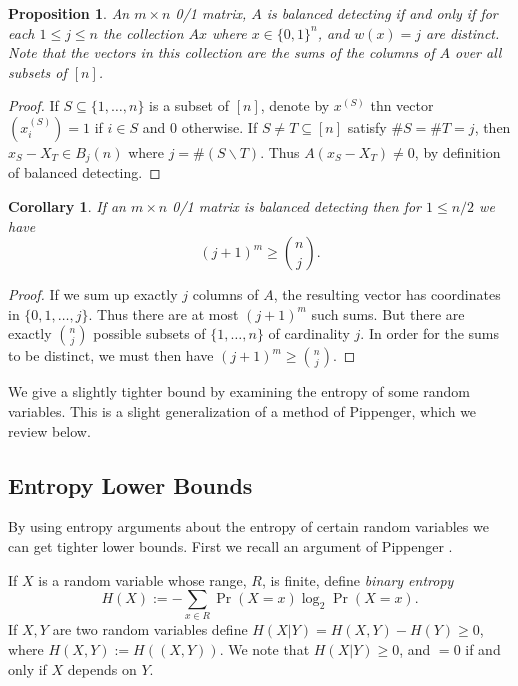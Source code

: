 \documentclass{article}
\newtheorem{proposition}{Proposition}
\newtheorem{corollary}{Corollary}
\begin{document}
\begin{proposition}
  An $m\times n$ 0/1 matrix, $A$ is balanced detecting if and only if
  for each $1 \le j \le n$ the
  collection $A x$ where $x\in \{0,1\}^n$, and $w(x) = j$ are
  distinct.  Note that the vectors in this collection are the sums of
  the columns of $A$ over all subsets of $[n]$.
\end{proposition}
\begin{proof}
  If $S \subseteq \{1, \dots, n\}$ is a subset of $[n]$, denote by
  $x^{(S)}$  thn vector $(x^{(S)}_i) = 1$ if $i \in S$ and 0
  otherwise.  If $S \ne T \subseteq [n]$ satisfy $\#S = \#T = j$, then
  $x_S - X_T \in B_j(n)$ where $j = \# (S \backslash T)$.  Thus
  $A(x_S - X_T) \ne 0$, by definition of balanced detecting.
\end{proof}
\begin{corollary}
  If an $m \times n$ 0/1 matrix is balanced detecting then for $1 \le
  n/2$ we have
  \begin{displaymath}
    (j+1)^m \ge \binom{n}{j}.
  \end{displaymath}
\end{corollary}
\begin{proof}
  If we sum up exactly $j$ columns of $A$, the resulting vector has
  coordinates in $\{0,1, \dots, j\}$.  Thus there are at most
  $(j+1)^m$ such sums.  But there are exactly $\binom{n}{j}$ possible
  subsets of $\{1, \dots, n\}$ of cardinality $j$.  In order for the
  sums to be distinct, we must then have $(j+1)^m \ge \binom{n}{j}$.
\end{proof}
We give a slightly tighter bound by examining the entropy of
some random variables.  This is a slight generalization of a method of
Pippenger, which we review below.

\subsection{Entropy Lower Bounds}
\label{sec:entropy}

By using entropy arguments about the entropy of certain random
variables we can get tighter lower bounds.  First we
recall an argument of Pippenger \cite{pippenger1977information}.

If $X$ is a random variable whose range, $R$, is finite, define
\emph{binary entropy}
\begin{displaymath}
  H(X) := - \sum_{x \in R} \Pr(X = x) \log_2 \Pr(X = x).
\end{displaymath}
If $X,Y$ are two random variables define $H(X | Y) = H(X, Y) - H(Y)
\ge 0$, where $H(X,Y) := H((X,Y))$.  We note that $H(X | Y) \ge 0$,
and $=0$ if and only if $X$ depends on $Y$.
\end{document}
